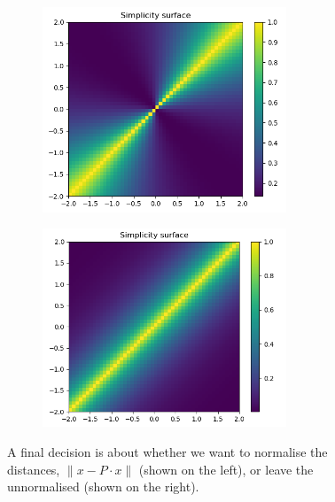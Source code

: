 \begin{figure}[h!]
\centering
\begin{subfigure}{.5\textwidth}
  \centering
	\includegraphics[width=0.8\textwidth,height=0.25\textheight]{../../pictures/figures/complexity_surface_2d-normed.png}
  \label{fig:sub1}
\end{subfigure}%
\begin{subfigure}{.5\textwidth}
  \centering
	\includegraphics[width=0.8\textwidth,height=0.25\textheight]{../../pictures/figures/complexity_surface_2d-not-normed.png}
  \label{fig:sub2}
\end{subfigure}
\caption{A final decision is about whether we want to normalise the distances,
$\parallel x - P\cdot x \parallel$ (shown on the left), or leave the unnormalised (shown on the right).}
\label{fig:normalise-symmetry}
\end{figure}

